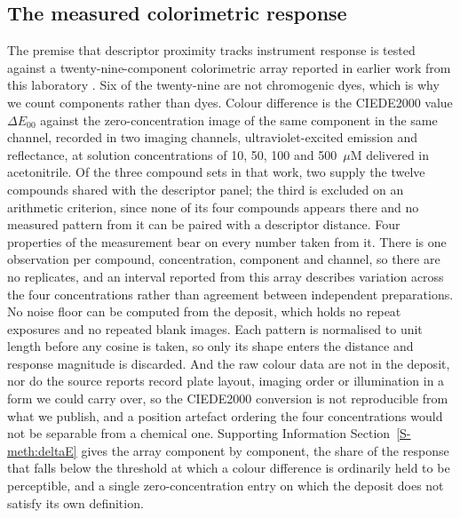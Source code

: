 \documentclass[journal=ancham,manuscript=article,margin=1in]{achemso}
\begin{document}
\subsection{The measured colorimetric response}
\label{meth:array}
The premise that descriptor proximity tracks instrument response is tested
against a twenty-nine-component colorimetric array reported in earlier work
from this laboratory \cite{hazref,multiplexref,group3ref}. Six of the
twenty-nine are not chromogenic dyes, which is why we count components rather
than dyes. Colour difference is the CIEDE2000 value $\Delta E_{00}$ against the
zero-concentration image of the same component in the same channel, recorded in
two imaging channels, ultraviolet-excited emission and reflectance, at solution
concentrations of 10, 50, 100 and 500~$\mu$M delivered in acetonitrile. Of the
three compound sets in that work, two supply the twelve compounds shared with
the descriptor panel; the third is excluded on an arithmetic criterion, since
none of its four compounds appears there and no measured pattern from it can be
paired with a descriptor distance. Four properties of the measurement bear on
every number taken from it. There is one observation per compound, concentration, component and channel,
so there are no replicates, and an interval reported from this array describes
variation across the four concentrations rather than agreement between
independent preparations. No noise floor can be computed from the deposit,
which holds no repeat exposures and no repeated blank images. Each pattern
is normalised to unit length before any cosine is taken, so only its shape
enters the distance and response magnitude is discarded. And
the raw colour data are not in the deposit, nor do the source reports record
plate layout, imaging order or illumination in a form we could carry over, so
the CIEDE2000 conversion is not reproducible from what we publish, and a
position artefact ordering the four concentrations would not be separable from
a chemical one.
Supporting Information Section~\ref{S-meth:deltaE} gives the array component by
component, the share of the response that falls below the threshold at which a
colour difference is ordinarily held to be perceptible, and a single
zero-concentration entry on which the deposit does not satisfy its own
definition.
\end{document}
